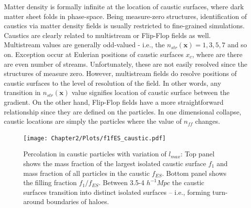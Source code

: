 
Matter density is formally infinite at the location of caustic surfaces, where dark matter sheet folds in phase-space. Being measure-zero structures, identification of caustics via matter density fields is usually restricted to fine-grained simulations. Caustics are clearly related to multistream or Flip-Flop fields as well. Multistream values are generally odd-valued - i.e., the $n_{str}(\mathbf{x}) = 1, 3, 5, 7$  and so on. Exception occur at Eulerian positions of caustic surfaces $x_c$, where are there are even number of streams. Unfortunately, these are not easily resolved since the structures of measure zero. However, multistream fields do resolve positions of caustic surfaces to the level of resolution of the field. In other words, any transition in $n_{str}(\mathbf{x})$ value signifies location of caustic surface between the gradient. On the other hand, Flip-Flop fields have a more straightforward relationship since they are defined on the particles. In one dimensional collapse, caustic locations are simply the particles where the value of $n_{ff}$ changes. 

\begin{figure} 
\centering\texttt{[image: Chapter2/Plots/f1fES\_caustic.pdf]} 
\caption{Percolation in caustic particles with variation of $l_{max}$: Top panel shows the mass fraction of the largest isolated caustic surface $f_1$ and mass fraction of all particles in the caustic $f_{ES}$. Bottom panel shows the filling fraction $f_1/f_{ES}$. Between 3.5-4 $h^{-1} Mpc$ the caustic surfaces transition into distinct isolated surfaces -- i.e., forming turn-around boundaries of haloes. }
\label{fig:caustic_perc_lmax}
\end{figure}

